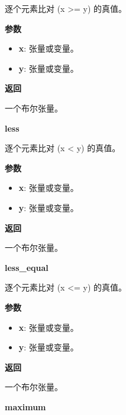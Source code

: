逐个元素比对 (x \textgreater{}= y) 的真值。

\textbf{参数}

\begin{itemize}
\tightlist
\item
  \textbf{x}: 张量或变量。
\item
  \textbf{y}: 张量或变量。
\end{itemize}

\textbf{返回}

一个布尔张量。


\textbf{less}\label{less}

\begin{Shaded}
\begin{Highlighting}[]
\end{Highlighting}
\end{Shaded}

逐个元素比对 (x \textless{} y) 的真值。

\textbf{参数}

\begin{itemize}
\tightlist
\item
  \textbf{x}: 张量或变量。
\item
  \textbf{y}: 张量或变量。
\end{itemize}

\textbf{返回}

一个布尔张量。


\textbf{less\_equal}\label{lessux5fequal}

\begin{Shaded}
\begin{Highlighting}[]
\end{Highlighting}
\end{Shaded}

逐个元素比对 (x \textless{}= y) 的真值。

\textbf{参数}

\begin{itemize}
\tightlist
\item
  \textbf{x}: 张量或变量。
\item
  \textbf{y}: 张量或变量。
\end{itemize}

\textbf{返回}

一个布尔张量。


\textbf{maximum}\label{maximum}

\begin{Shaded}
\begin{Highlighting}[]
\end{Highlighting}
\end{Shaded}

